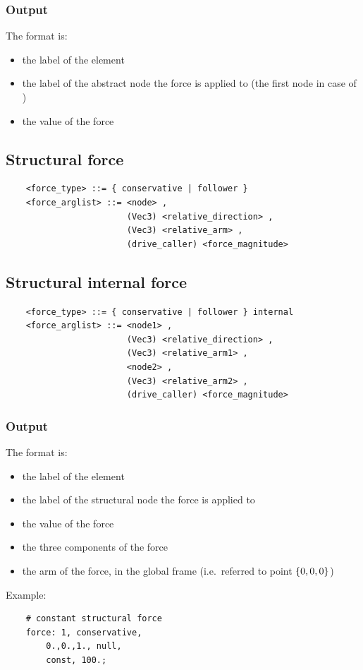 \subsubsection{Output}
The format is:
\begin{itemize}
    \item the label of the element
    \item the label of the abstract node the force is applied to
	(the first node in case of )
    \item the value of the force
\end{itemize}


\subsection{Structural force}
\begin{verbatim}
    <force_type> ::= { conservative | follower } 
    <force_arglist> ::= <node> , 
                        (Vec3) <relative_direction> ,
                        (Vec3) <relative_arm> ,
                        (drive_caller) <force_magnitude>
\end{verbatim}

\subsection{Structural internal force}
\begin{verbatim}
    <force_type> ::= { conservative | follower } internal
    <force_arglist> ::= <node1> , 
                        (Vec3) <relative_direction> ,
                        (Vec3) <relative_arm1> ,
                        <node2> ,
                        (Vec3) <relative_arm2> ,
                        (drive_caller) <force_magnitude>
\end{verbatim}

\subsubsection{Output}
The format is:
\begin{itemize}
    \item the label of the element
    \item the label of the structural node the force is applied to
    \item the value of the force
    \item the three components of the force
    \item the arm of the force, in the global frame (i.e.\ referred
          to point $ \left\{ 0,0,0 \right\} $)
\end{itemize}
Example:
\begin{verbatim}
    # constant structural force
    force: 1, conservative,
        0.,0.,1., null,
        const, 100.;
\end{verbatim}


